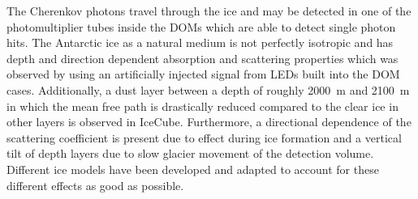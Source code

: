 The Cherenkov photons travel through the ice and may be detected in one of the photomultiplier tubes inside the DOMs which are able to detect single photon hits.
The Antarctic ice as a natural medium is not perfectly isotropic and has depth and direction dependent absorption and scattering properties which was observed by using an artificially injected signal from LEDs built into the DOM cases.
Additionally, a dust layer between a depth of roughly \SI{2000}{\m} and \SI{2100}{m} in which the mean free path is drastically reduced compared to the clear ice in other layers is observed in IceCube.
Furthermore, a directional dependence of the scattering coefficient is present due to effect during ice formation and a vertical tilt of depth layers due to slow glacier movement of the detection volume.
Different ice models have been developed and adapted to account for these different effects as good as possible.
